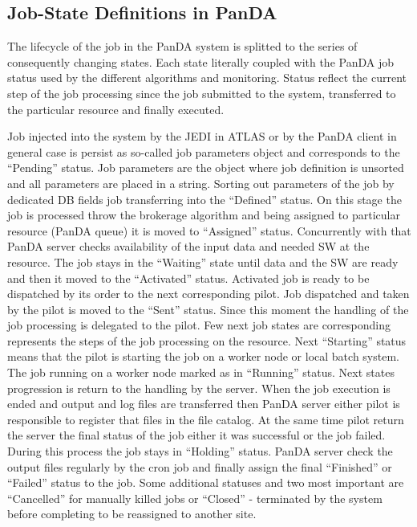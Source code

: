 \subsection{Job-State Definitions in PanDA}
\label{subsec:jobstatedefs}

The lifecycle of the job in the PanDA system is splitted to the series of
consequently changing states. Each state literally coupled with the PanDA job
status used by the different algorithms and monitoring. Status reflect the
current step of the job processing since the job submitted to the system,
transferred to the particular resource and finally executed.

Job injected into the system by the JEDI in ATLAS or by the PanDA client in
general case is persist as so-called job parameters object and corresponds to
the ``Pending'' status. Job parameters are the object where job definition is
unsorted and all parameters are placed in a string. Sorting out parameters of
the job by dedicated DB fields job transferring into the ``Defined'' status.
On this stage the job is processed throw the brokerage algorithm and being
assigned to particular resource (PanDA queue) it is moved to ``Assigned''
status. Concurrently with that PanDA server checks availability of the input
data and needed SW at the resource. The job stays in the ``Waiting'' state
until data and the SW are ready and then it moved to the ``Activated''
status. Activated job is ready to be dispatched by its order to the next
corresponding pilot. Job dispatched and taken by the pilot is moved to the
``Sent'' status. Since this moment the handling of the job processing is
delegated to the pilot. Few next job states are corresponding represents the
steps of the job processing on the resource. Next ``Starting'' status means
that the pilot is starting the job on a worker node or local batch system.
The job running on a worker node marked as in ``Running'' status. Next states
progression is return to the handling by the server. When the job execution
is ended and output and log files are transferred then PanDA server either
pilot is responsible to register that files in the file catalog. At the same
time pilot return the server the final status of the job either it was
successful or the job failed. During this process the job stays in
``Holding'' status. PanDA server check the output files regularly by the cron
job and finally assign the final ``Finished'' or ``Failed'' status to the
job. Some additional statuses and two most important are ``Cancelled'' for
manually killed jobs or ``Closed'' - terminated by the system before
completing to be reassigned to another site.

